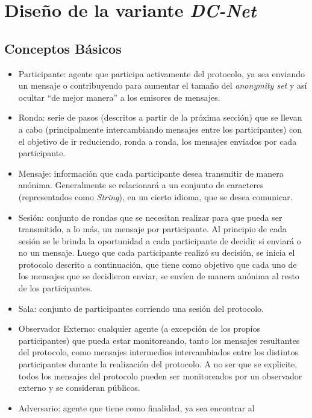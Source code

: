 \chapter{Diseño de la variante \emph{DC-Net}}\label{cap3}

\section{Conceptos Básicos}

\begin{itemize}
    \item Participante: agente que participa activamente del protocolo, ya sea 
    enviando un mensaje o contribuyendo para aumentar el tamaño del 
    \emph{anonymity set} y así ocultar ``de mejor manera'' a los emisores de 
    mensajes. 
    \item Ronda: serie de pasos (descritos a partir de la próxima sección) que 
    se llevan a cabo (principalmente intercambiando mensajes entre los 
    participantes) con el objetivo de ir reduciendo, ronda a ronda, los 
    mensajes enviados por cada participante.
    \item Mensaje: información que cada participante desea transmitir de 
    manera anónima. Generalmente se relacionará a un conjunto de caracteres 
    (representados como \emph{String}), en un cierto idioma, que se desea 
    comunicar.
    \item Sesión: conjunto de rondas que se necesitan realizar para que pueda 
    ser transmitido, a lo más, un mensaje por participante. Al principio de 
    cada sesión se le brinda la oportunidad a cada participante de decidir si 
    enviará o no un mensaje. Luego que cada participante realizó su decisión, 
    se inicia el protocolo descrito a continuación, que tiene como objetivo 
    que cada uno de los mensajes que se decidieron enviar, se envíen de manera 
    anónima al resto de los participantes.
    \item Sala: conjunto de participantes corriendo una sesión del protocolo.
    \item Observador Externo: cualquier agente (a excepción de los propios 
    participantes) que pueda estar monitoreando, tanto los mensajes 
    resultantes del protocolo, como mensajes intermedios intercambiados entre 
    los distintos participantes durante la realización del protocolo. A no ser 
    que se explicite, todos los mensajes del protocolo pueden ser monitoreados 
    por un observador externo y se consideran públicos.
    \item Adversario: agente que tiene como finalidad, ya sea encontrar al 

\end{itemize}
